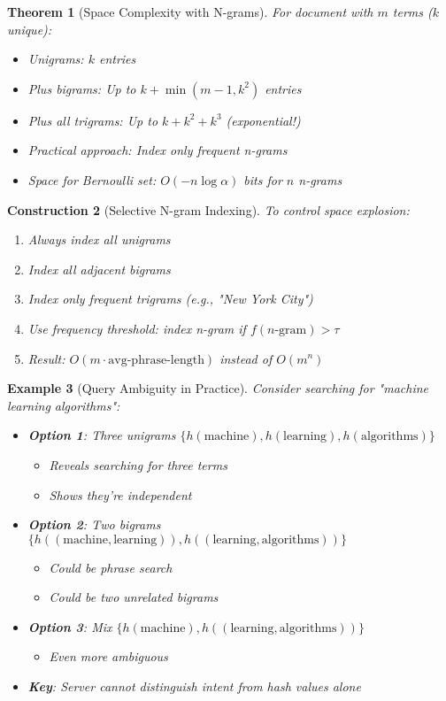 \documentclass[11pt,final]{article}
\newtheorem{theorem}{Theorem}[section]
\newtheorem{example}[theorem]{Example}
\newtheorem{construction}[theorem]{Construction}
\begin{document}
\begin{theorem}[Space Complexity with N-grams]
For document with $m$ terms ($k$ unique):
\begin{itemize}
    \item Unigrams: $k$ entries
    \item Plus bigrams: Up to $k + \min(m-1, k^2)$ entries
    \item Plus all trigrams: Up to $k + k^2 + k^3$ (exponential!)
    \item Practical approach: Index only frequent n-grams
    \item Space for Bernoulli set: $O(-n \log \alpha)$ bits for $n$ n-grams
\end{itemize}
\end{theorem}

\begin{construction}[Selective N-gram Indexing]
To control space explosion:
\begin{enumerate}
    \item Always index all unigrams
    \item Index all adjacent bigrams
    \item Index only frequent trigrams (e.g., "New York City")
    \item Use frequency threshold: index n-gram if $f(n\text{-gram}) > \tau$
    \item Result: $O(m \cdot \text{avg-phrase-length})$ instead of $O(m^n)$
\end{enumerate}
\end{construction}

\begin{example}[Query Ambiguity in Practice]
Consider searching for "machine learning algorithms":
\begin{itemize}
    \item \textbf{Option 1}: Three unigrams $\{h(\text{machine}), h(\text{learning}), h(\text{algorithms})\}$
        \begin{itemize}
            \item Reveals searching for three terms
            \item Shows they're independent
        \end{itemize}
    \item \textbf{Option 2}: Two bigrams $\{h((\text{machine}, \text{learning})), h((\text{learning}, \text{algorithms}))\}$
        \begin{itemize}
            \item Could be phrase search
            \item Could be two unrelated bigrams
        \end{itemize}
    \item \textbf{Option 3}: Mix $\{h(\text{machine}), h((\text{learning}, \text{algorithms}))\}$
        \begin{itemize}
            \item Even more ambiguous
        \end{itemize}
    \item \textbf{Key}: Server cannot distinguish intent from hash values alone
\end{itemize}
\end{example}
\end{document}

